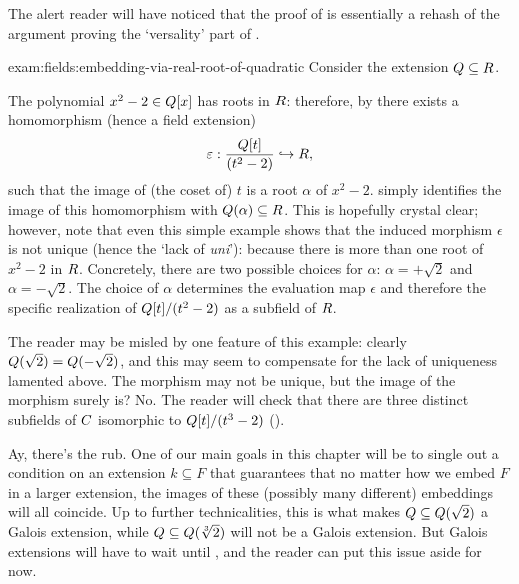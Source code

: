 The alert reader will have noticed that the proof of
 is essentially a rehash of the argument proving
the `versality' part of .
\begin{exam}{}{exam:fields:embedding-via-real-root-of-quadratic}
  Consider the extension $Q \subseteq R$.

  The polynomial $x^2 - 2 \in Q[x]$ has roots in $R$: therefore, by
   there exists a homomorphism (hence a field
  extension)
  \[\varepsilon : \frac{Q[t]}{(t^2 - 2)} \hookrightarrow R,\]
  such that the image of (the coset of) $t$ is a root $\alpha$ of
  $x^2 - 2$.  simply identifies the image of
  this homomorphism with $Q(\alpha) \subseteq R$.  This is hopefully
  crystal clear; however, note that even this simple example shows
  that the induced morphism $\epsilon$ is not unique (hence the `lack
  of \emph{uni}'): because there is more than one root of $x^2 - 2$
  in $R$. Concretely, there are two possible choices for $\alpha$:
  $\alpha = +\sqrt{2}$ and $\alpha = -\sqrt{2}$. The choice of
  $\alpha$ determines the evaluation map $\epsilon$ and therefore the
  specific realization of $Q[t]/(t^2 - 2)$ as a subfield of $R$.

  The reader may be misled by one feature of this example: clearly
  $Q(\sqrt{2}) = Q(-\sqrt{2})$, and this may seem to compensate for
  the lack of uniqueness lamented above. The morphism may not be
  unique, but the image of the morphism surely is? No. The reader will
  check that there are three distinct subfields of $C$ isomorphic to
  $Q[t]/(t^3 - 2)$
  ().
\end{exam}

Ay, there's the rub. One of our main goals in this chapter will be to
single out a condition on an extension $k \subseteq F$ that guarantees
that no matter how we embed $F$ in a larger extension, the images of
these (possibly many different) embeddings will all coincide. Up to
further technicalities, this is what makes $Q \subseteq Q(\sqrt{2})$
a Galois extension, while $Q \subseteq Q(\sqrt[3]{2})$ will not be a
Galois extension. But Galois extensions will have to wait until
, and the reader can put
this issue aside for now.

